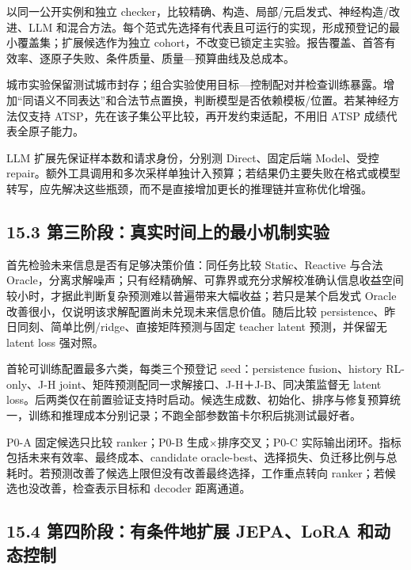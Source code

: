 \documentclass[UTF8,10pt,a4paper,fontset=fandol]{ctexart}
\begin{document}

以同一公开实例和独立 checker，比较精确、构造、局部/\allowbreak{}元启发式、神经构造/\allowbreak{}改进、LLM 和混合方法。每个范式先选择有代表且可运行的实现，形成预登记的最小覆盖集；扩展候选作为独立 cohort，不改变已锁定主实验。报告覆盖、首答有效率、逐原子失败、条件质量、质量—预算曲线及总成本。


城市实验保留测试城市封存；组合实验使用目标—控制配对并检查训练暴露。增加“同语义不同表达”和合法节点置换，判断模型是否依赖模板/\allowbreak{}位置。若某神经方法仅支持 ATSP，先在该子集公平比较，再开发约束适配，不用旧 ATSP 成绩代表全原子能力。


LLM 扩展先保证样本数和请求身份，分别测 Direct、固定后端 Model、受控 repair。额外工具调用和多次采样单独计入预算；若结果仍主要失败在格式或模型转写，应先解决这些瓶颈，而不是直接增加更长的推理链并宣称优化增强。


\subsection*{15.3 第三阶段：真实时间上的最小机制实验}


首先检验未来信息是否有足够决策价值：同任务比较 Static、Reactive 与合法 Oracle，分离求解噪声；只有经精确解、可靠界或充分求解校准确认信息收益空间较小时，才据此判断复杂预测难以普遍带来大幅收益；若只是某个启发式 Oracle 改善很小，仅说明该求解配置尚未兑现未来信息价值。随后比较 persistence、昨日同刻、简单比例/\allowbreak{}ridge、直接矩阵预测与固定 teacher latent 预测，并保留无 latent loss 强对照。


首轮可训练配置最多六类，每类三个预登记 seed：persistence fusion、history RL-only、J-H joint、矩阵预测配同一求解接口、J-H＋J-B、同决策监督无 latent loss。后两类仅在前置验证支持时启动。候选生成数、初始化、排序与修复预算统一，训练和推理成本分别记录；不跑全部参数笛卡尔积后挑测试最好者。


P0-A 固定候选只比较 ranker；P0-B 生成\ensuremath{\times}排序交叉；P0-C 实际输出闭环。指标包括未来有效率、最终成本、candidate oracle-best、选择损失、负迁移比例与总耗时。若预测改善了候选上限但没有改善最终选择，工作重点转向 ranker；若候选也没改善，检查表示目标和 decoder 距离通道。


\subsection*{15.4 第四阶段：有条件地扩展 JEPA、LoRA 和动态控制}
\end{document}
